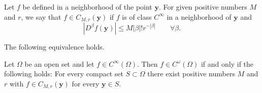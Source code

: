 \begin{Definition}
\label{def:factorial-derivative-class}
Let $f$ be defined in a neighborhood of the point $\bm{y}$. For given positive numbers $M$ and $r$, we say that $f\in C_{M,r}(\bm{y})$ if $f$ is of class $C^\infty$ in a neighborhood of $\bm{y}$ and
\begin{equation}\label{eq:factorial-derivative-class-bound}
|D^\beta f(\bm{y})|\leq M|\beta|!r^{-|\beta|}\qquad\forall\beta.
\end{equation}

\end{Definition}

The following equivalence holds.

\begin{Theorem}
\label{thm:factorial-bound-analytic-equivalence}
Let $\Omega$ be an open set and let $f\in C^\infty(\Omega)$. Then $f\in C^\omega(\Omega)$ if and only if the following holds: For every compact set $S\subset\Omega$ there exist positive numbers $M$ and $r$ with $f\in C_{M,r}(\bm{y})$ for every $\bm{y}\in S$.
\end{Theorem}

